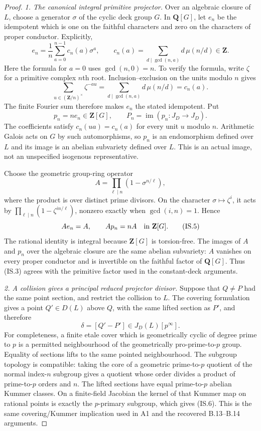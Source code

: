 \documentclass[11pt,a4paper]{article}
\begin{document}
\begin{proof}
\emph{1. The canonical integral primitive projector.}
Over an algebraic closure of $L$, choose a generator $\sigma$
of the cyclic deck group $G$. In $\mathbf Q[G]$, let $e_n$
be the idempotent which is one on the faithful characters and
zero on the characters of proper conductor. Explicitly,
\[
 e_n=\frac1n\sum_{a=0}^{n-1}c_n(a)\sigma^a,
 \qquad
 c_n(a)=\sum_{d\mid\gcd(n,a)}d\,\mu(n/d)\in\mathbf Z.
 \tag{IS.2}
\]
Here the formula for $a=0$ uses $\gcd(n,0)=n$.
To verify the formula, write $\zeta$ for a primitive complex
$n$th root. Inclusion--exclusion on the units modulo $n$ gives
\[
 \sum_{u\in(\mathbf Z/n)^\times}\zeta^{-au}
       =\sum_{d\mid\gcd(n,a)}d\,\mu(n/d)=c_n(a).
\]
The finite Fourier sum therefore makes $e_n$ the stated
idempotent. Put
\[
        p_n=ne_n\in\mathbf Z[G],\qquad
        P_n=\operatorname{im}(p_n:J_D\longrightarrow J_D).
 \tag{IS.3}
\]
The coefficients satisfy $c_n(ua)=c_n(a)$ for every unit $u$
modulo $n$. Arithmetic Galois acts on $G$ by such automorphisms,
so $p_n$ is an endomorphism defined over $L$ and its image is an
abelian subvariety defined over $L$. This is an actual image,
not an unspecified isogenous representative.

Choose the geometric group-ring operator
\[
                 A=\prod_{\ell\mid n}(1-\sigma^{n/\ell}),
 \tag{IS.4}
\]
where the product is over distinct prime divisors. On the
character $\sigma\mapsto\zeta^i$, it acts by
$\prod_{\ell\mid n}(1-\zeta^{i n/\ell})$, nonzero exactly
when $\gcd(i,n)=1$. Hence
\[
                  Ae_n=A,\qquad Ap_n=nA
                       \quad\hbox{in }\mathbf Z[G].
 \tag{IS.5}
\]
The rational identity is integral because $\mathbf Z[G]$
is torsion-free. The images of $A$ and $p_n$ over the algebraic
closure are the same abelian subvariety: $A$ vanishes on every
proper conductor and is invertible on the faithful factor of
$\mathbf Q[G]$. Thus (IS.3) agrees with the primitive factor
used in the constant-deck arguments.

\emph{2. A collision gives a principal reduced projector divisor.}
Suppose that $Q\ne P$ had the same point section, and restrict
the collision to $L$. The covering formulation gives a point
$Q'\in D(L)$ above $Q$, with the same lifted section as $P'$,
and therefore
\[
                        \delta=[Q'-P']
                              \in J_D(L)[p^\infty].
 \tag{IS.6}
\]
For completeness, a finite etale cover which is geometrically
cyclic of degree prime to $p$ is a permitted neighbourhood of
the geometrically pro-prime-to-$p$ group. Equality of sections
lifts to the same pointed neighbourhood. The subgroup topology
is compatible: taking the core of a geometric prime-to-$p$
quotient of the normal index-$n$ subgroup gives a quotient
whose order divides a product of prime-to-$p$ orders and $n$.
The lifted sections have equal prime-to-$p$ abelian Kummer
classes. On a finite-field Jacobian the kernel of that Kummer
map on rational points is exactly the $p$-primary subgroup,
which gives (IS.6). This is the same covering/Kummer implication
used in A1 and the recovered B.13--B.14 arguments.


\end{proof}
\end{document}
